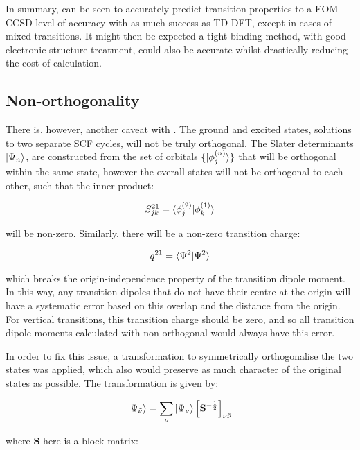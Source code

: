 In summary, \dscf can be seen to accurately predict transition properties
to a EOM-CCSD level of accuracy with as much success as TD-DFT, except in cases
of mixed transitions. It might then be expected a tight-binding method, with good electronic 
structure treatment, could also be accurate whilst drastically reducing
the cost of calculation. 

\subsection{Non-orthogonality}
\label{subsec:dscf_nonorth}
There is, however, another caveat with \dscf. The ground and excited states, solutions
to two separate SCF cycles, will not be truly orthogonal. The
Slater determinants $\ket{\Psi_n}$, are constructed from the set of orbitals 
$\{ \ket{\phi_j^{\left(n\right)}} \}$ that will be orthogonal within the same state,
however the overall states will not be orthogonal to each other, such that the inner product:

\begin{equation}
S^{21}_{jk} = \braket{\phi_j^{\left(2\right)} | \phi_k^{\left(1\right)}}
\end{equation}

will be non-zero. Similarly, there will be a non-zero transition charge:

\begin{equation}
q^{21} = \braket{\Psi^2|\Psi^2}
\end{equation}

which breaks the origin-independence property of the transition dipole moment. In
this way, any transition dipoles that do not have their centre at the origin will
have a systematic error based on this overlap and the distance from the origin.
For vertical transitions, this transition charge should be zero, and so all transition
dipole moments calculated with non-orthogonal \dscf would always have this error.

In order to fix this issue, a transformation to symmetrically orthogonalise the two states
was applied, which also would preserve as much character of the original states as possible.
The transformation is given by:

\begin{equation}
\ket{\Psi_{\tilde{\nu}}} = \sum_{\nu} \ket{\Psi_\nu} \left[\mathbf{S}^{-\frac{1}{2}} \right]_{\nu\tilde{\nu}}
\end{equation}

where $\mathbf{S}$ here is a block matrix:

